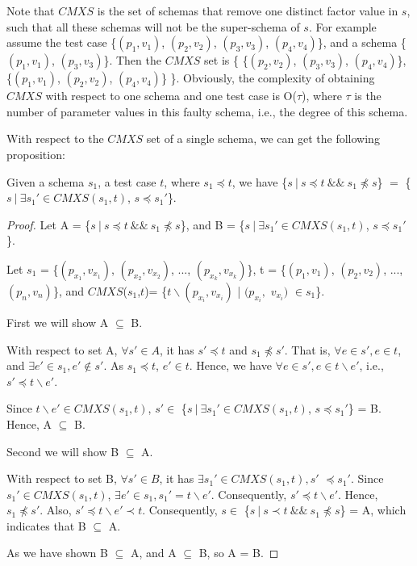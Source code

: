 Note that $CMXS$ is the set of schemas that remove one distinct factor value in $s$, such that all these schemas will not be the super-schema of $s$. For example assume the test case \{$(p_{1}, v_{1})$, $(p_{2}, v_{2})$, $(p_{3}, v_{3})$, $(p_{4}, v_{4})$\}, and a schema \{$(p_{1}, v_{1})$, $(p_{3}, v_{3})$\}. Then the $CMXS$ set is \{ \{$(p_{2}, v_{2})$,  $(p_{3}, v_{3})$, $(p_{4}, v_{4})$\}, \{$(p_{1}, v_{1})$,  $(p_{2}, v_{2})$, $(p_{4}, v_{4})$\} \}. Obviously, the complexity of obtaining $CMXS$ with respect to one schema and one test case is O($\tau$), where $\tau$ is the number of parameter values in this faulty schema, i.e., the degree of this schema.

With respect to the $CMXS$ set of a single schema, we can get the following proposition:


\begin{proposition}\label{pro:subofCMXS}
Given a schema $s_{1}$, a test case $t$, where $s_{1} \preceq t$, we have \{$s\ |\ s \preceq t\ \&\&\ s_{1} \npreceq s$\} $=$  \{$ s\ |\ \exists s_{1}' \in CMXS(s_{1}, t)$, $s \preceq s_{1}'$\}.
\end{proposition}

\begin{proof}

Let A =  \{$s\ |\ s \preceq t\ \&\&\ s_{1} \npreceq s$\}, and B = \{$ s\ |\ \exists s_{1}' \in CMXS(s_{1}, t)$, $s \preceq s_{1}'$\}.



Let $s_{1}$ = \{$(p_{x_{1}}, v_{x_{1}})$, $(p_{x_{2}}, v_{x_{2}})$, ..., $(p_{x_{k}}, v_{x_{k}})$\},  t = \{$(p_{1}, v_{1})$, $(p_{2}, v_{2})$, ..., $(p_{n}, v_{n})$\}, and $CMXS$($s_{1}$,$t$)= \{$t \backslash (p_{x_{i}}, v_{x_{i}})$ | $(p_{x_{i}},$ $v_{x_{i}})$ $ \in s_{1} $\}.

First we will show A $\subseteq$ B.

With respect to set A, $\forall s' \in A$, it has $s' \preceq t$ and $ s_{1} \npreceq s'$. That is, $\forall e \in s', e \in t$, and  $\exists e' \in s_{1}, e' \not\in s'$. As $s_{1} \preceq t$, $e' \in t$. Hence, we have $\forall e \in s', e \in t \backslash e'$, i.e., $s' \preceq t \backslash e'$.

Since $t \backslash e' \in CMXS(s_{1}, t)$,  $s' \in $ \{$ s\ |\ \exists s_{1}' \in CMXS(s_{1}, t)$, $s \preceq s_{1}'$\} = B. Hence, A $\subseteq$ B.

Second we will show B $\subseteq$ A.

With respect to set B, $\forall s' \in B$, it has $\exists s_{1}' \in CMXS(s_{1}, t), s'$ $ \preceq s_{1}'$. Since $s_{1}' \in CMXS(s_{1}, t)$, $\exists e' \in s_{1}, s_{1}' =  t \backslash e'$. Consequently, $s' \preceq t \backslash e'$. Hence, $s_{1} \npreceq s'$. Also, $s' \preceq t \backslash e' \prec t$. Consequently, $s \in $  \{$s\ |\ s \prec t\ \&\&\ s_{1} \npreceq s$\} = A, which indicates that B $\subseteq$ A.

As we have shown B $\subseteq$ A, and A $\subseteq$ B, so A = B.

\end{proof}

